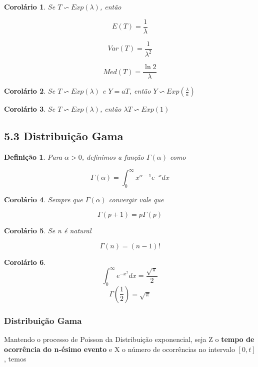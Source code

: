 \documentclass[12pt]{article}
\newtheorem{corollary}{Corolário}[theorem]
\newtheorem{definition}{Definição}
\begin{document}
\begin{corollary}
    Se $T \backsim Exp(\lambda)$, então
    
    $$E(T) = \dfrac{1}{\lambda}$$
    
    $$Var(T) = \dfrac{1}{\lambda^2}$$
    
    $$Med(T) = \dfrac{\ln 2}{\lambda}$$
\end{corollary}
                            
\begin{corollary}
    Se $T \backsim Exp(\lambda)$ e $Y = a T$, então $Y \backsim Exp(\frac{\lambda}{a})$

\end{corollary}

\begin{corollary}
    Se $T \backsim Exp(\lambda)$, então $\lambda T \backsim Exp(1)$
\end{corollary}

\subsection*{5.3 Distribuição Gama}
\label{s23}

\begin{definition}
    Para $\alpha > 0$, definimos a função $\Gamma(\alpha)$ como
    
    $$\Gamma(\alpha) = \int_0^\infty x^{\alpha - 1} e^{-x} d x$$
\end{definition}

\begin{corollary}
    Sempre que $\Gamma(\alpha)$ convergir vale que
    
    $$\Gamma(p + 1) = p \Gamma(p)$$
\end{corollary}

\begin{corollary}
    Se n é natural
    
    $$\Gamma(n) = (n-1)!$$
\end{corollary}

\begin{corollary}
    $$\int_0^\infty e^{-x^2} d x = \frac{\sqrt{\pi}}{2}$$
    $$\Gamma \left (\frac{1}{2} \right ) = \sqrt{\pi}$$
\end{corollary}

\subsubsection*{Distribuição Gama}

Mantendo o processo de Poisson da Distribuição exponencial, seja Z o \textbf{tempo de ocorrência do n-ésimo evento} e X o número de ocorrências no intervalo $[0, t]$, temos
\end{document}
